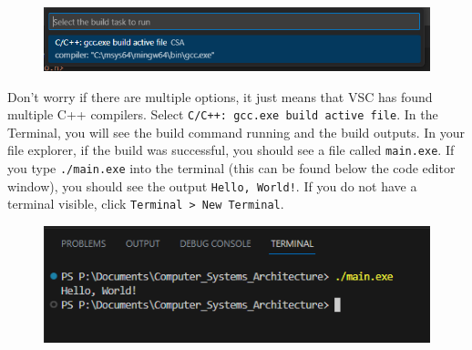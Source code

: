 \documentclass{article}
\newcommand{\code}[1]{\colorbox{codegrey}{\lstinline|#1|}}
\begin{document}
\begin{figure}[h]
    \centering
    \includegraphics[width=0.8\linewidth]{Compiler.png}
    \label{fig:enter-label}
\end{figure}

Don't worry if there are multiple options, it just means that VSC has found multiple C++ compilers. Select \code{C/C++: gcc.exe build active file}. In the Terminal, you will see the build command running and the build outputs. In your file explorer, if the build was successful, you should see a file called \code{main.exe}. If you type \code{./main.exe} into the terminal (this can be found below the code editor window), you should see the output \code{Hello, World!}. If you do not have a terminal visible, click \code{Terminal > New Terminal}.
\begin{figure}[h]
    \centering
    \includegraphics[width=0.8\linewidth]{output.png}
    \label{fig:enter-label}
\end{figure}
\newpage
\end{document}
